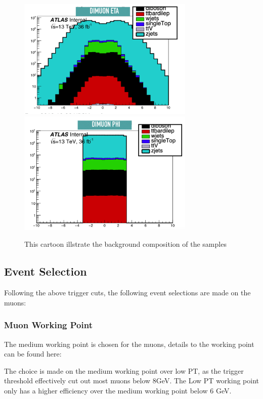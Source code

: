 \begin{figure}[!htb]
    \begin{center}
        \includegraphics[width=0.75\textwidth]{figures/chapter_dimuon/backgroundcomposition}
        \includegraphics[width=0.75\textwidth]{figures/chapter_dimuon/backgroundcomposition2}
        \caption{
        This cartoon illstrate the background composition of the samples }
    \end{center}
\end{figure}

\subsection{Event Selection}
Following the above trigger cuts, the following event selections are made on the muons:

\subsubsection*{Muon Working Point}
The medium working point is chosen for the muons, details to the working point can be found here: 

The choice is made on the medium working point over low PT, as the trigger threshold effectively cut out most muons below 8GeV. The Low PT working point only has a higher efficiency over the medium working point below  6 GeV. 

